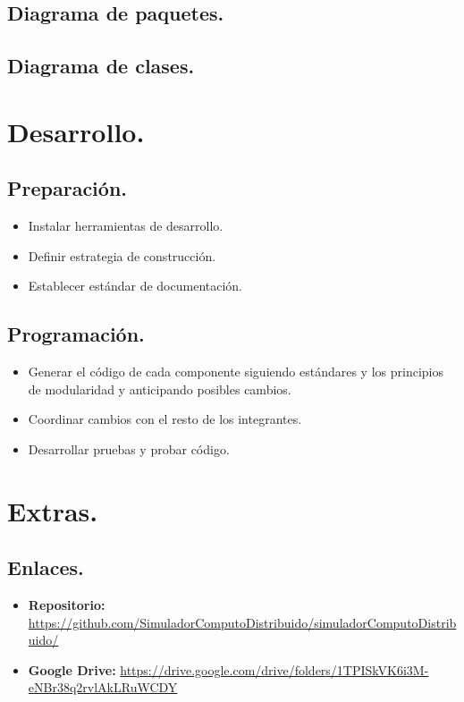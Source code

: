 \documentclass[a4paper,12pt]{article}
\begin{document}
\subsection{Diagrama de paquetes.}{
  \label{paquetes}
}
\subsection{Diagrama de clases.}{
  \label{clases}
}

\section{Desarrollo.}
\subsection{Preparación.}{
  \begin{itemize}
    \item{Instalar herramientas de desarrollo.}
    \item{Definir estrategia de construcción.}
    \item{Establecer estándar de documentación.}
  \end{itemize}
}
\subsection{Programación.}{
  \begin{itemize}
    \item{Generar el código de cada componente siguiendo estándares y los
    principios de modularidad y anticipando posibles cambios.
    }
    \item{Coordinar cambios con el resto de los integrantes.}
    \item{Desarrollar pruebas y probar código.}
  \end{itemize}
}

\section{Extras.}
\subsection{Enlaces.}{
  \label{enlaces}
  \begin{itemize}
    \item{\textbf{Repositorio: }  \url{https://github.com/SimuladorComputoDistribuido/simuladorComputoDistribuido/}}
    \item{\textbf{Google Drive: } \url{https://drive.google.com/drive/folders/1TPISkVK6i3M-eNBr38q2rvlAkLRuWCDY}}
  \end{itemize}
}
\end{document}
